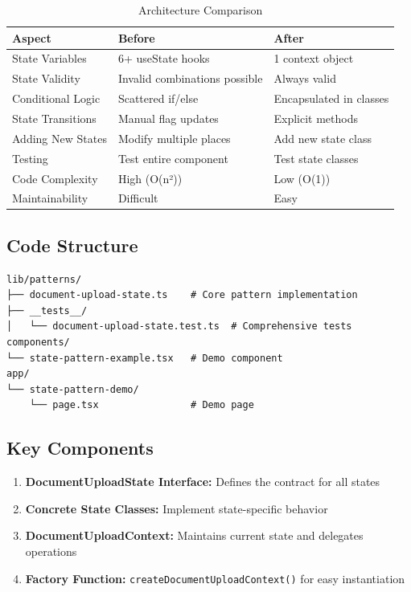 \documentclass[11pt,a4paper]{article}
\begin{document}
\begin{table}[H]
\centering
\begin{tabular}{@{}lll@{}}
\toprule
\textbf{Aspect} & \textbf{Before} & \textbf{After} \\
\midrule
State Variables & 6+ useState hooks & 1 context object \\
State Validity & Invalid combinations possible & Always valid \\
Conditional Logic & Scattered if/else & Encapsulated in classes \\
State Transitions & Manual flag updates & Explicit methods \\
Adding New States & Modify multiple places & Add new state class \\
Testing & Test entire component & Test state classes \\
Code Complexity & High (O(n²)) & Low (O(1)) \\
Maintainability & Difficult & Easy \\
\bottomrule
\end{tabular}
\caption{Architecture Comparison}
\end{table}

\subsection{Code Structure}

\begin{verbatim}
lib/patterns/
├── document-upload-state.ts    # Core pattern implementation
├── __tests__/
│   └── document-upload-state.test.ts  # Comprehensive tests
components/
└── state-pattern-example.tsx   # Demo component
app/
└── state-pattern-demo/
    └── page.tsx                # Demo page
\end{verbatim}

\subsection{Key Components}

\begin{enumerate}
    \item \textbf{DocumentUploadState Interface:} Defines the contract for all states
    \item \textbf{Concrete State Classes:} Implement state-specific behavior
    \item \textbf{DocumentUploadContext:} Maintains current state and delegates operations
    \item \textbf{Factory Function:} \texttt{createDocumentUploadContext()} for easy instantiation
\end{enumerate}
\end{document}
